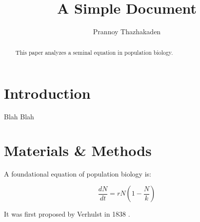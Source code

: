 \documentclass[12pt]{article}
\begin{document}
\title{A Simple Document}

\author{Prannoy Thazhakaden}

\date{}

    \maketitle
  
    \begin{abstract}
        This paper analyzes a seminal equation in population biology.
    \end{abstract}

    \section{Introduction}
        Blah Blah

    \section{Materials \& Methods}

    A foundational equation of population biology is:

    \begin{equation}
        \frac{dN}{dt} = r N (1 - \frac{N}{k})
    \end{equation}

    It was first proposed by Verhulst in 1838 \cite{verhulst1838notice}.
  
    

    
\end{document}
